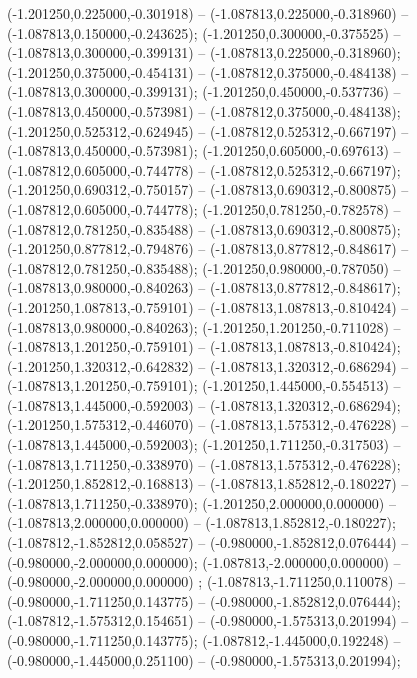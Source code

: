 (-1.201250,0.225000,-0.301918) -- (-1.087813,0.225000,-0.318960) -- (-1.087813,0.150000,-0.243625);
 (-1.201250,0.300000,-0.375525) -- (-1.087813,0.300000,-0.399131) -- (-1.087813,0.225000,-0.318960);
 (-1.201250,0.375000,-0.454131) -- (-1.087812,0.375000,-0.484138) -- (-1.087813,0.300000,-0.399131);
 (-1.201250,0.450000,-0.537736) -- (-1.087813,0.450000,-0.573981) -- (-1.087812,0.375000,-0.484138);
 (-1.201250,0.525312,-0.624945) -- (-1.087812,0.525312,-0.667197) -- (-1.087813,0.450000,-0.573981);
 (-1.201250,0.605000,-0.697613) -- (-1.087812,0.605000,-0.744778) -- (-1.087812,0.525312,-0.667197);
 (-1.201250,0.690312,-0.750157) -- (-1.087813,0.690312,-0.800875) -- (-1.087812,0.605000,-0.744778);
 (-1.201250,0.781250,-0.782578) -- (-1.087812,0.781250,-0.835488) -- (-1.087813,0.690312,-0.800875);
 (-1.201250,0.877812,-0.794876) -- (-1.087813,0.877812,-0.848617) -- (-1.087812,0.781250,-0.835488);
 (-1.201250,0.980000,-0.787050) -- (-1.087813,0.980000,-0.840263) -- (-1.087813,0.877812,-0.848617);
 (-1.201250,1.087813,-0.759101) -- (-1.087813,1.087813,-0.810424) -- (-1.087813,0.980000,-0.840263);
 (-1.201250,1.201250,-0.711028) -- (-1.087813,1.201250,-0.759101) -- (-1.087813,1.087813,-0.810424);
 (-1.201250,1.320312,-0.642832) -- (-1.087813,1.320312,-0.686294) -- (-1.087813,1.201250,-0.759101);
 (-1.201250,1.445000,-0.554513) -- (-1.087813,1.445000,-0.592003) -- (-1.087813,1.320312,-0.686294);
 (-1.201250,1.575312,-0.446070) -- (-1.087813,1.575312,-0.476228) -- (-1.087813,1.445000,-0.592003);
 (-1.201250,1.711250,-0.317503) -- (-1.087813,1.711250,-0.338970) -- (-1.087813,1.575312,-0.476228);
 (-1.201250,1.852812,-0.168813) -- (-1.087813,1.852812,-0.180227) -- (-1.087813,1.711250,-0.338970);
 (-1.201250,2.000000,0.000000) -- (-1.087813,2.000000,0.000000) -- (-1.087813,1.852812,-0.180227);
 (-1.087812,-1.852812,0.058527) -- (-0.980000,-1.852812,0.076444) -- (-0.980000,-2.000000,0.000000);
 (-1.087813,-2.000000,0.000000) -- (-0.980000,-2.000000,0.000000) ;
 (-1.087813,-1.711250,0.110078) -- (-0.980000,-1.711250,0.143775) -- (-0.980000,-1.852812,0.076444);
 (-1.087812,-1.575312,0.154651) -- (-0.980000,-1.575313,0.201994) -- (-0.980000,-1.711250,0.143775);
 (-1.087812,-1.445000,0.192248) -- (-0.980000,-1.445000,0.251100) -- (-0.980000,-1.575313,0.201994);

